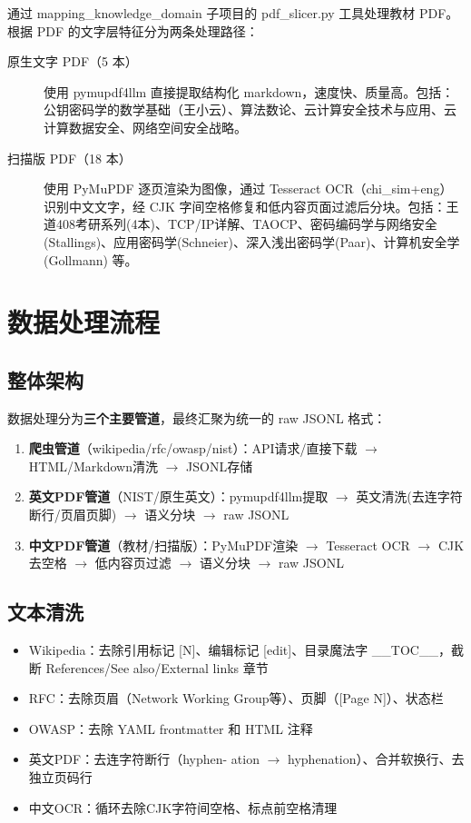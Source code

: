 \documentclass[12pt,a4paper]{ctexart}
\begin{document}
通过 mapping\_knowledge\_domain 子项目的 pdf\_slicer.py 工具处理教材 PDF。根据 PDF 的文字层特征分为两条处理路径：

\begin{description}
    \item[原生文字 PDF（5 本）] 使用 pymupdf4llm 直接提取结构化 markdown，速度快、质量高。包括：公钥密码学的数学基础（王小云）、算法数论、云计算安全技术与应用、云计算数据安全、网络空间安全战略。
    \item[扫描版 PDF（18 本）] 使用 PyMuPDF 逐页渲染为图像，通过 Tesseract OCR（chi\_sim+eng）识别中文文字，经 CJK 字间空格修复和低内容页面过滤后分块。包括：王道408考研系列(4本)、TCP/IP详解、TAOCP、密码编码学与网络安全(Stallings)、应用密码学(Schneier)、深入浅出密码学(Paar)、计算机安全学(Gollmann) 等。
\end{description}

\section{数据处理流程}

\subsection{整体架构}

数据处理分为\textbf{三个主要管道}，最终汇聚为统一的 raw JSONL 格式：

\begin{enumerate}
    \item \textbf{爬虫管道}（wikipedia/rfc/owasp/nist）：API请求/直接下载 $\to$ HTML/Markdown清洗 $\to$ JSONL存储
    \item \textbf{英文PDF管道}（NIST/原生英文）：pymupdf4llm提取 $\to$ 英文清洗(去连字符断行/页眉页脚) $\to$ 语义分块 $\to$ raw JSONL
    \item \textbf{中文PDF管道}（教材/扫描版）：PyMuPDF渲染 $\to$ Tesseract OCR $\to$ CJK去空格 $\to$ 低内容页过滤 $\to$ 语义分块 $\to$ raw JSONL
\end{enumerate}

\subsection{文本清洗}

\begin{itemize}
    \item Wikipedia：去除引用标记 [N]、编辑标记 [edit]、目录魔法字 \_\_TOC\_\_，截断 References/See also/External links 章节
    \item RFC：去除页眉（Network Working Group等）、页脚（[Page N]）、状态栏
    \item OWASP：去除 YAML frontmatter 和 HTML 注释
    \item 英文PDF：去连字符断行（hyphen- ation $\to$ hyphenation）、合并软换行、去独立页码行
    \item 中文OCR：循环去除CJK字符间空格、标点前空格清理
\end{itemize}
\end{document}
